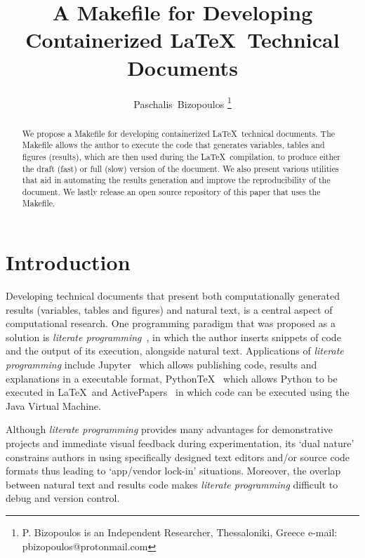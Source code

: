 \documentclass[journal]{IEEEtran}
\begin{document}

\title{A Makefile for Developing Containerized \LaTeX\ Technical Documents}

\author{Paschalis~Bizopoulos
\thanks{P. Bizopoulos is an Independent Researcher, Thessaloniki, Greece e-mail: pbizopoulos@protonmail.com}}

\maketitle

\begin{abstract}
	We propose a Makefile for developing containerized \LaTeX\ technical documents.
	The Makefile allows the author to execute the code that generates variables, tables and figures (results), which are then used during the \LaTeX\ compilation, to produce either the draft (fast) or full (slow) version of the document.
	We also present various utilities that aid in automating the results generation and improve the reproducibility of the document.
	We lastly release an open source repository of this paper that uses the Makefile.
\end{abstract}

\section{Introduction}
Developing technical documents that present both computationally generated results (variables, tables and figures) and natural text, is a central aspect of computational research.
One programming paradigm that was proposed as a solution is \textit{literate programming}~\cite{knuth1984literate}, in which the author inserts snippets of code and the output of its execution, alongside natural text.
Applications of \textit{literate programming} include Jupyter~\cite{kluyver2016jupyter} which allows publishing code, results and explanations in a executable format, PythonTeX~\cite{poore2015pythontex} which allows Python to be executed in \LaTeX\ and ActivePapers~\cite{hinsen2014activepapers} in which code can be executed using the Java Virtual Machine.

Although \textit{literate programming} provides many advantages for demonstrative projects and immediate visual feedback during experimentation, its `dual nature' constrains authors in using specifically designed text editors and/or source code formats thus leading to `app/vendor lock-in' situations.
Moreover, the overlap between natural text and results code makes \textit{literate programming} difficult to debug and version control.
\end{document}
